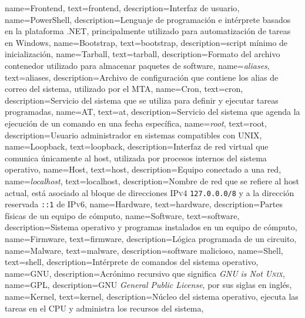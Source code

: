 {
  name={Frontend},
  text={frontend},
  description={Interfaz de usuario},
}
{
  name={PowerShell},
  description={Lenguaje de programaci\'{o}n e int\'{e}rprete basados en la plataforma .NET, principalmente utilizado para automatizaci\'{o}n de tareas en Windows},
}
{
  name={Bootstrap},
  text={bootstrap},
  description={\Gls{script} m\'{i}nimo de inicializaci\'{o}n},
}
{
  name={Tarball},
  text={tarball},
  description={Formato del archivo contenedor utilizado para almacenar paquetes de \gls{software}},
}
{
  name={\emph{aliases}},
  text={aliases},
  description={Archivo de configuraci\'{o}n que contiene los alias de correo del sistema, utilizado por el \gls{MTA}},
}
{
  name={Cron},
  text={cron},
  description={Servicio del sistema que se utiliza para definir y ejecutar tareas programadas},
}
{
  name={AT},
  text={at},
  description={Servicio del sistema que agenda la ejecuci\'{o}n de un comando en una fecha espec\'{i}fica},
}
{
  name={\emph{root}},
  text={root},
  description={Usuario administrador en sistemas compatibles con \textsc{UNIX}},
}
{
  name={Loopback},
  text={loopback},
  description={Interfaz de red virtual que comunica \'{u}nicamente al \gls{host}, utilizada por procesos internos del sistema operativo},
}
{
  name={Host},
  text={host},
  description={Equipo conectado a una red},
}
{
  name={\emph{localhost}},
  text={localhost},
  description={Nombre de red que se refiere al \gls{host} actual, est\'{a} asociado al bloque de direcciones \textsc{IPv4} \texttt{127.0.0.0/8} y a la direcci\'{o}n reservada \texttt{::1} de \textsc{IPv6}},
}
{
  name={Hardware},
  text={hardware},
  description={Partes f\'{i}sicas de un equipo de c\'{o}mputo},
}
{
  name={Software},
  text={software},
  description={Sistema operativo y programas instalados en un equipo de c\'{o}mputo},
}
{
  name={Firmware},
  text={firmware},
  description={L\'{o}gica programada de un circuito},
}
{
  name={Malware},
  text={malware},
  description={\Gls{software} malicioso},
}
{
  name={Shell},
  text={shell},
  description={Int\'{e}rprete de comandos del sistema operativo},
}
{
  name={GNU},
  description={Acr\'{o}nimo recursivo que significa \textit{GNU is Not \textsc{Unix}}},
}
{
  name={GPL},
  description={\gls{GNU} \textit{General Public License}, por sus siglas en ingl\'{e}s},
}
{
  name=Kernel,
  text=kernel,
  description={N\'{u}cleo del sistema operativo, ejecuta las tareas en el CPU y administra los recursos del sistema},
}

